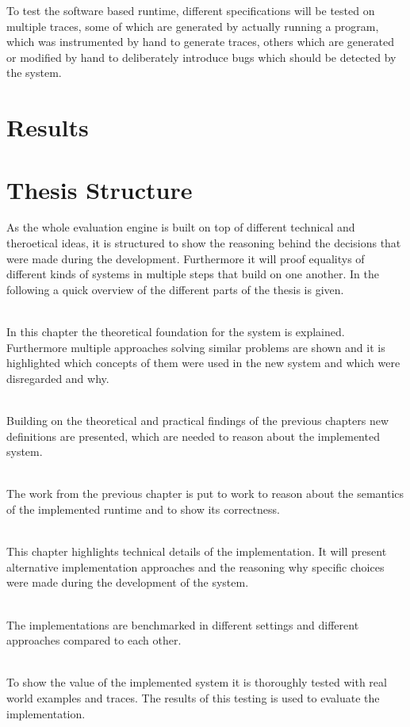 To test the software based runtime, different specifications will be tested on multiple traces, some of which are generated by actually running a program,
which was instrumented by hand to generate traces, others which are generated or modified by hand to deliberately introduce bugs which should be detected by the system.

\section{Results}
\label{sec:intro:results}


\section{Thesis Structure}
\label{sec:intro:structure}

As the whole evaluation engine is built on top of different technical and theroetical ideas, it is structured to show
the reasoning behind the decisions that were made during the development.
Furthermore it will proof equalitys of different kinds of systems in multiple steps that build on one another.
In the following a quick overview of the different parts of the thesis is given.

\textbf{} \\[0.2em]

In this chapter the theoretical foundation for the system is explained.
Furthermore multiple approaches solving similar problems are shown and it is highlighted which concepts of them were
used in the new system and which were disregarded and why.


\textbf{} \\[0.2em]

Building on the theoretical and practical findings of the previous chapters new definitions are presented, which are needed to reason about the implemented system.

\textbf{} \\[0.2em]

The work from the previous chapter is put to work to reason about the semantics of the implemented runtime and to show its correctness.

\textbf{} \\[0.2em]

This chapter highlights technical details of the implementation.
It will present alternative implementation approaches and the reasoning why specific choices were made during the development of the system.

\textbf{} \\[0.2em]

The implementations are benchmarked in different settings and different approaches compared to each other.

\textbf{} \\[0.2em]

To show the value of the implemented system it is thoroughly tested with real world examples and traces.
The results of this testing is used to evaluate the implementation.

